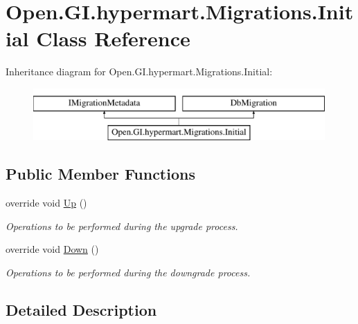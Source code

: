 \hypertarget{class_open_1_1_g_i_1_1hypermart_1_1_migrations_1_1_initial}{}\section{Open.\+G\+I.\+hypermart.\+Migrations.\+Initial Class Reference}
\label{class_open_1_1_g_i_1_1hypermart_1_1_migrations_1_1_initial}


 


Inheritance diagram for Open.\+G\+I.\+hypermart.\+Migrations.\+Initial\+:\begin{figure}[H]
\begin{center}
\leavevmode
\includegraphics[height=2.000000cm]{class_open_1_1_g_i_1_1hypermart_1_1_migrations_1_1_initial}
\end{center}
\end{figure}
\subsection*{Public Member Functions}
\begin{DoxyCompactItemize}
\item 
override void \hyperlink{class_open_1_1_g_i_1_1hypermart_1_1_migrations_1_1_initial_a0d322b6e395871e51474b0a1accfa014}{Up} ()
\begin{DoxyCompactList}\small\item\em Operations to be performed during the upgrade process. \end{DoxyCompactList}\item 
override void \hyperlink{class_open_1_1_g_i_1_1hypermart_1_1_migrations_1_1_initial_a30a9317e9693d9c0431a1bda53d4497b}{Down} ()
\begin{DoxyCompactList}\small\item\em Operations to be performed during the downgrade process. \end{DoxyCompactList}\end{DoxyCompactItemize}


\subsection{Detailed Description}


